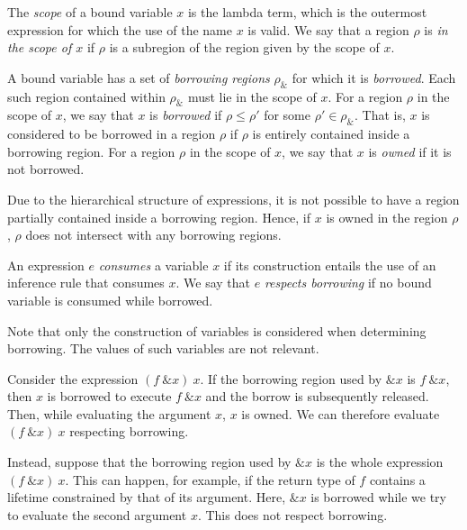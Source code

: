 \documentclass[11pt]{book}
\begin{document}
\begin{defn}
  The \textit{scope} of a bound variable \( x \) is the lambda term, which is the outermost expression for which the use of the name \( x \) is valid.
  We say that a region \( \rho \) is \textit{in the scope of \( x \)} if \( \rho \) is a subregion of the region given by the scope of \( x \).

  A bound variable has a set of \textit{borrowing regions} \( \rho_{\&} \) for which it is \textit{borrowed}.
  Each such region contained within \( \rho_{\&} \) must lie in the scope of \( x \).
  For a region \( \rho \) in the scope of \( x \), we say that \( x \) is \textit{borrowed} if \( \rho \leq \rho' \) for some \( \rho' \in \rho_{\&} \).
  That is, \( x \) is considered to be borrowed in a region \( \rho \) if \( \rho \) is entirely contained inside a borrowing region.
  For a region \( \rho \) in the scope of \( x \), we say that \( x \) is \textit{owned} if it is not borrowed.

  Due to the hierarchical structure of expressions, it is not possible to have a region partially contained inside a borrowing region.
  Hence, if \( x \) is owned in the region \( \rho \), \( \rho \) does not intersect with any borrowing regions.
\end{defn}
\begin{defn}
  An expression \( e \) \textit{consumes} a variable \( x \) if its construction entails the use of an inference rule that consumes \( x \).
  We say that \( e \) \textit{respects borrowing} if no bound variable is consumed while borrowed.
\end{defn}
Note that only the construction of variables is considered when determining borrowing.
The values of such variables are not relevant.
\begin{eg}
  Consider the expression \( (f\ \&x)\ x \).
  If the borrowing region used by \( \&x \) is \( f\ \&x \), then \( x \) is borrowed to execute \( f\ \&x \) and the borrow is subsequently released.
  Then, while evaluating the argument \( x \), \( x \) is owned.
  We can therefore evaluate \( (f\ \&x)\ x \) respecting borrowing.

  Instead, suppose that the borrowing region used by \( \&x \) is the whole expression \( (f\ \&x)\ x \).
  This can happen, for example, if the return type of \( f \) contains a lifetime constrained by that of its argument.
  Here, \( \&x \) is borrowed while we try to evaluate the second argument \( x \).
  This does not respect borrowing.
\end{eg}
\end{document}
